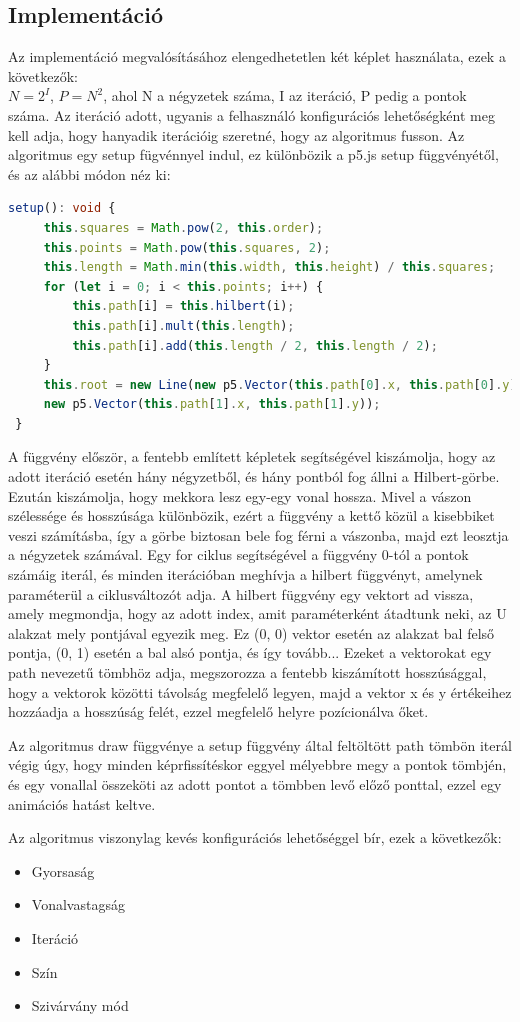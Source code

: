 \subsection*{Implementáció}
Az implementáció megvalósításához elengedhetetlen két képlet használata, ezek a következők:\\
$N = 2^I$,
$P = N^2$, ahol N a négyzetek száma, I az iteráció, P pedig a pontok száma. Az iteráció adott, ugyanis a felhasználó konfigurációs lehetőségként meg kell adja, hogy hanyadik iterációig szeretné, hogy az algoritmus fusson. 
Az algoritmus egy setup fügvénnyel indul, ez különbözik a p5.js setup függvényétől, és az alábbi módon néz ki:
\begin{lstlisting}[language=typescript]
 setup(): void {
	 this.squares = Math.pow(2, this.order);
	 this.points = Math.pow(this.squares, 2);
	 this.length = Math.min(this.width, this.height) / this.squares;
	 for (let i = 0; i < this.points; i++) {
		 this.path[i] = this.hilbert(i);
		 this.path[i].mult(this.length);
		 this.path[i].add(this.length / 2, this.length / 2);
	 }
	 this.root = new Line(new p5.Vector(this.path[0].x, this.path[0].y),
	 new p5.Vector(this.path[1].x, this.path[1].y));
 }
\end{lstlisting}
A függvény először, a fentebb említett képletek segítségével kiszámolja, hogy az adott iteráció esetén hány négyzetből, és hány pontból fog állni a Hilbert-görbe. Ezután kiszámolja, hogy mekkora lesz egy-egy vonal hossza. Mivel a vászon szélessége és hosszúsága különbözik, ezért a függvény a kettő közül a kisebbiket veszi számításba, így a görbe biztosan bele fog férni a vászonba, majd ezt leosztja a négyzetek számával. Egy for ciklus segítségével a függvény 0-tól a pontok számáig iterál, és minden iterációban meghívja a hilbert függvényt, amelynek paraméterül a ciklusváltozót adja. A hilbert függvény egy vektort ad vissza, amely megmondja, hogy az adott index, amit paraméterként átadtunk neki, az U alakzat mely pontjával egyezik meg. Ez (0, 0) vektor esetén az alakzat bal felső pontja, (0, 1) esetén a bal alsó pontja, és így tovább... Ezeket a vektorokat egy path nevezetű tömbhöz adja, megszorozza a fentebb kiszámított hosszúsággal, hogy a vektorok közötti távolság megfelelő legyen, majd a vektor x és y értékeihez hozzáadja a hosszúság felét, ezzel megfelelő helyre pozícionálva őket.
\par Az algoritmus draw függvénye a setup függvény által feltöltött path tömbön iterál végig úgy, hogy minden képrfissítéskor eggyel mélyebbre megy a pontok tömbjén, és egy vonallal összeköti az adott pontot a tömbben levő előző ponttal, ezzel egy animációs hatást keltve. 
\par Az algoritmus viszonylag kevés konfigurációs lehetőséggel bír, ezek a következők:
\begin{itemize}
	\item Gyorsaság
	\item Vonalvastagság
	\item Iteráció
	\item Szín
	\item Szivárvány mód
\end{itemize}
